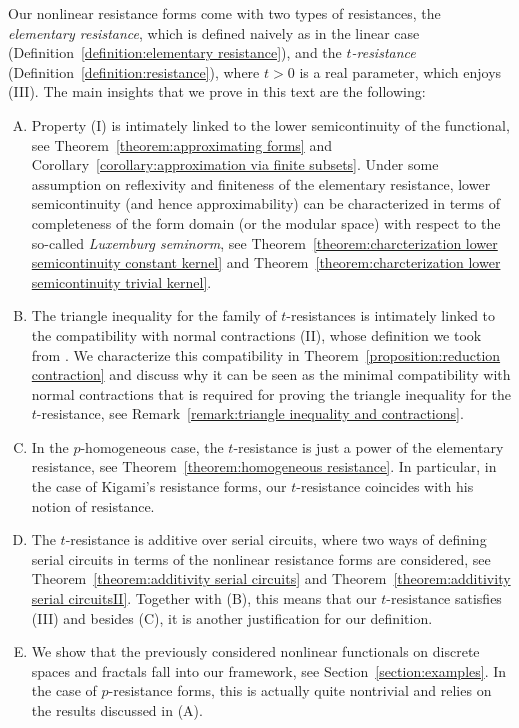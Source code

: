 \documentclass[a4paper,11pt,reqno]{amsart}
\theoremstyle{definition}
\numberwithin{equation}{section}
\newcommand{\1}{\mathds{1}}
\begin{document}
  Our nonlinear resistance forms come with two types of resistances, the {\em elementary resistance}, which is defined naively as in the linear case (Definition~\ref{definition:elementary resistance}),  and  the {\em $t$-resistance} (Definition~\ref{definition:resistance}), where $t > 0$ is a real parameter, which enjoys (III). The main insights that we prove in this text are the following: 
%
\begin{enumerate}[(A)]
 \item Property (I) is intimately linked to the lower semicontinuity of the functional, see Theorem~\ref{theorem:approximating forms} and Corollary~\ref{corollary:approximation via finite subsets}. Under some assumption on reflexivity and finiteness of the elementary resistance, lower semicontinuity (and hence approximability) can be characterized in terms of completeness of the form domain (or the modular space) with respect to the so-called {\em Luxemburg seminorm}, see Theorem~\ref{theorem:charcterization lower semicontinuity constant kernel} and Theorem~\ref{theorem:charcterization lower semicontinuity trivial kernel}.
 
 \item The triangle inequality for the family of $t$-resistances  is intimately linked to the compatibility with normal contractions (II), whose definition we took from \cite{Puc25}. We characterize this compatibility in Theorem~\ref{proposition:reduction contraction} and discuss  why it can be seen as the minimal compatibility with normal contractions that is required for proving  the triangle inequality for the $t$-resistance, see  Remark~\ref{remark:triangle inequality and contractions}.
 
 \item  In the $p$-homogeneous case, the $t$-resistance is just a power of the elementary resistance, see Theorem~\ref{theorem:homogeneous resistance}.   In particular, in the case of Kigami's resistance forms, our $t$-resistance coincides with his notion of resistance. 
 
 \item  The $t$-resistance is additive over serial circuits, where two ways of defining serial circuits in terms of the nonlinear resistance forms are considered, see Theorem~\ref{theorem:additivity serial circuits} and Theorem~\ref{theorem:additivity serial circuitsII}. Together with (B), this means that our $t$-resistance  satisfies (III) and besides (C), it is another justification for our definition. 
 
 \item We show that the previously considered nonlinear functionals on discrete spaces and fractals fall into our framework, see Section~\ref{section:examples}. In the case of $p$-resistance forms, this is actually quite nontrivial and relies on the results discussed in (A). 
\end{enumerate}
\end{document}
